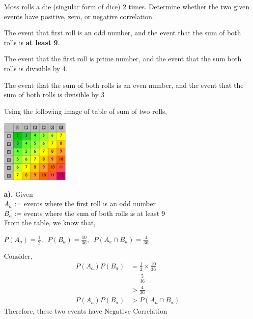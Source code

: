 \documentclass[a4paper, 10pt]{article}
\begin{document}
\begin{tosubmit}
\problem[13]
Moss rolls a die (singular form of dice) 2 times. Determine whether the two given events have positive, zero, or negative correlation.
\begin{subproblems}
    \item The event that first roll is an odd number, and the event that the sum of both rolls is \textbf{at least 9}.
    \item The event that the first roll is prime number, and the event that the sum both rolls is divisible by 4.
    \item The event that the sum of both rolls is an even number, and the event that the sum of both rolls is divisible by 3
\end{subproblems}

\submitsolution
Using the following image of table of sum of two rolls,
\begin{center}
    \includegraphics[width=0.25\textwidth]{Images/hw02-dice.png}
\end{center}

\par\noindent\textbf{a).} Given \\
\( A_a \) := events where the first roll is an odd number \\
\( B_a \) := events where the sum of both rolls is at least 9 \\
From the table, we know that,
\begin{center}
    \( P(A_a) = \frac{1}{2},\enspace P(B_a) = \frac{10}{36},\enspace P(A_a \cap B_a) = \frac{4}{36} \)
\end{center}
Consider,
\begin{align*}
    \allowbreak
    P(A_a)P(B_a) &= \frac{1}{2}\times\frac{10}{36} \\
    &= \frac{5}{36} \\
    &> \frac{4}{36} \\
    P(A_a)P(B_a) &> P(A_a \cap B_a)
\end{align*}
Therefore, these two events have \( \boxed{\text{Negative Correlation}} \) \\


\end{tosubmit}
\end{document}
